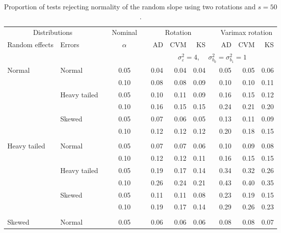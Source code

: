 \begin{table}[ht]
\centering
\caption{\label{tab:simb150}Proportion of tests rejecting normality of the random slope using two rotations and $s = 50$.}
\begin{scriptsize}
\begin{tabular}{ll p{.1cm} c p{.1cm} rrr p{.1cm} rrr}
  \hline
  \multicolumn{2}{c}{Distributions}& & Nominal & &  \multicolumn{3}{c}{Rotation} & & \multicolumn{3}{c}{Varimax rotation} \\ \cline{1-2} \cline{6-8} \cline{10-12}   
  Random effects & Errors & & $\alpha$ & & AD & CVM & KS & & AD & CVM & KS \\ 
   \hline
& && && \multicolumn{7}{c}{$\sigma_{\varepsilon}^2 = 4$, \ \ $\sigma_{b_0}^2 = \sigma_{b_1}^2 = 1$} \\ \cline{6-12}
\rowcolor{gray!20}Normal       & Normal       && 0.05 &&  0.04 & 0.04 & 0.04 && 0.05 & 0.05 & 0.06 \\ 
\rowcolor{gray!20}             &              && 0.10 &&  0.08 & 0.08 & 0.09 && 0.10 & 0.10 & 0.11 \\ 
\rowcolor{gray!20}             & Heavy tailed && 0.05 &&  0.10 & 0.11 & 0.09 && 0.16 & 0.15 & 0.12 \\ 
\rowcolor{gray!20}             &              && 0.10 &&  0.16 & 0.15 & 0.15 && 0.24 & 0.21 & 0.20 \\ 
\rowcolor{gray!20}             & Skewed       && 0.05 &&  0.07 & 0.06 & 0.05 && 0.13 & 0.11 & 0.09 \\ 
\rowcolor{gray!20}             &              && 0.10 &&  0.12 & 0.12 & 0.12 && 0.20 & 0.18 & 0.15 \\ 
             &&&&&&&&&&&\\
Heavy tailed & Normal       && 0.05 &&  0.07 & 0.07 & 0.06 && 0.10 & 0.09 & 0.08 \\ 
             &              && 0.10 &&  0.12 & 0.12 & 0.11 && 0.16 & 0.15 & 0.15 \\ 
             & Heavy tailed && 0.05 &&  0.19 & 0.17 & 0.14 && 0.34 & 0.32 & 0.26 \\ 
             &              && 0.10 &&  0.26 & 0.24 & 0.21 && 0.43 & 0.40 & 0.35 \\ 
             & Skewed       && 0.05 &&  0.11 & 0.11 & 0.08 && 0.23 & 0.19 & 0.15 \\ 
             &              && 0.10 &&  0.19 & 0.17 & 0.14 && 0.29 & 0.26 & 0.23 \\ 
             &&&&&&&&&&&\\
Skewed       & Normal       && 0.05 &&  0.06 & 0.06 & 0.06 && 0.08 & 0.08 & 0.07 \\ 

\end{tabular}
\end{scriptsize}
\end{table}
